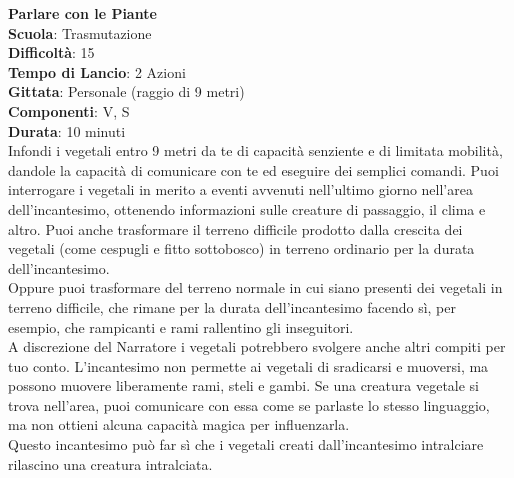 \begin{multicols}{2}
\medskip\textbf{Parlare con le Piante}\\
\textbf{Scuola}: Trasmutazione\\
\textbf{Difficoltà}: 15\\
\textbf{Tempo di Lancio}: 2 Azioni\\
\textbf{Gittata}: Personale (raggio di 9 metri)\\
\textbf{Componenti}: V, S\\
\textbf{Durata}: 10 minuti\\
Infondi i vegetali entro 9 metri da te di capacità senziente e di limitata mobilità, dandole la capacità di comunicare con te ed eseguire dei semplici comandi. Puoi interrogare i vegetali in merito a eventi avvenuti nell'ultimo giorno nell'area dell'incantesimo, ottenendo informazioni sulle creature di passaggio, il clima e altro. Puoi anche trasformare il terreno difficile prodotto dalla crescita dei vegetali (come cespugli e fitto sottobosco) in terreno ordinario per la durata dell'incantesimo.\\
Oppure puoi trasformare del terreno normale in cui siano presenti dei vegetali in terreno difficile, che rimane per la durata dell'incantesimo facendo sì, per esempio, che rampicanti e rami rallentino gli inseguitori. \\
A discrezione del Narratore i vegetali potrebbero svolgere anche altri compiti per tuo conto. L'incantesimo non permette ai vegetali di sradicarsi e muoversi, ma possono muovere liberamente rami, steli e gambi. Se una creatura vegetale si trova nell'area, puoi comunicare con essa come se parlaste lo stesso linguaggio, ma non ottieni alcuna capacità magica per influenzarla.\\
Questo incantesimo può far sì che i vegetali creati dall'incantesimo intralciare rilascino una creatura intralciata. 


\end{multicols}

